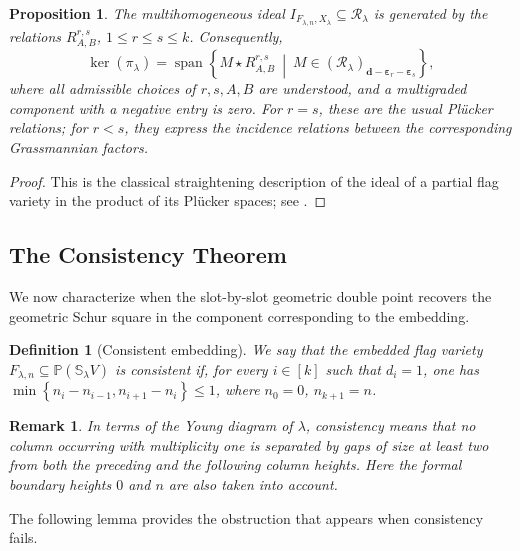 \documentclass[a4paper,reqno]{amsart}
\theoremstyle{plainnopunct}
\newtheorem{proposition}[proposition]{Proposition}
\theoremstyle{definitionnopunct}
\newtheorem{definition}[definition]{Definition}
\newtheorem{remark}[remark]{Remark}
\renewcommand{\P}{\mathbb{P}}
\renewcommand{\S}{\mathbb{S}}
\newcommand{\cR}{\mathcal{R}}
\newcommand{\bd}{\mathbf{d}}
\newcommand{\bepsilon}{\boldsymbol{\varepsilon}}
\begin{document}
\begin{proposition}
\label{prop: straightening Cartan kernel}
The multihomogeneous ideal
$I_{F_{\lambda,n},X_\lambda}
\subseteq
\cR_\lambda$
is generated by the relations
$R_{A,B}^{r,s}$, $1\leq r\leq s\leq k$.
Consequently,
\[
\ker(\pi_\lambda)
=
\operatorname{span}
\left\{
M\star R_{A,B}^{r,s}
\ \middle|\
M\in
(\cR_\lambda)_{\bd-\bepsilon_r-\bepsilon_s}
\right\},
\]
where all admissible choices of $r,s,A,B$ are understood, and a
multigraded component with a negative entry is zero. For $r=s$, these are the usual Pl\"ucker relations; for $r<s$, they
express the incidence relations between the corresponding
Grassmannian factors.
\end{proposition}

\begin{proof}
This is the classical straightening description of the ideal of a
partial flag variety in the product of its Pl\"ucker spaces; see
\cite[Sections~8.4 and~9.1]{Fulton1997}.
\end{proof}

\subsection{The Consistency Theorem}
\label{subsect: consistency}

We now characterize when the slot-by-slot geometric double point
recovers the geometric Schur square in the component corresponding to
the embedding.

\begin{definition}[Consistent embedding]
\label{def: consistent pair}
We say that the embedded flag variety
$F_{\lambda,n}
\subseteq
\P(\S_\lambda V)$
is \emph{consistent} if, for every $i\in[k]$ such that $d_i=1$, one
has $\min
\left\{
n_i-n_{i-1},
n_{i+1}-n_i
\right\}
\leq1$,
where
$n_0=0$,
$n_{k+1}=n$.
\end{definition}

\begin{remark}
\label{rem: combinatorial meaning consistency}
In terms of the Young diagram of $\lambda$, consistency means that no
column occurring with multiplicity one is separated by gaps of size at
least two from both the preceding and the following column heights.
Here the formal boundary heights $0$ and $n$ are also taken into
account.
\end{remark}

The following lemma provides the obstruction that appears when
consistency fails.
\end{document}
